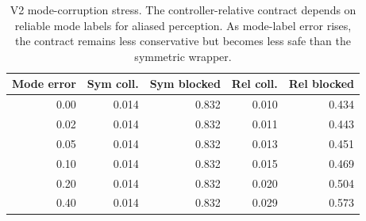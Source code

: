 \begin{table}[t]
\centering
\caption{V2 mode-corruption stress. The controller-relative contract depends on reliable mode labels for aliased perception. As mode-label error rises, the contract remains less conservative but becomes less safe than the symmetric wrapper.}
\label{tab:mode-corruption}
\begin{tabular}{rrrrr}
\toprule
Mode error & Sym coll. & Sym blocked & Rel coll. & Rel blocked \\
\midrule
0.00 & 0.014 & 0.832 & 0.010 & 0.434 \\
0.02 & 0.014 & 0.832 & 0.011 & 0.443 \\
0.05 & 0.014 & 0.832 & 0.013 & 0.451 \\
0.10 & 0.014 & 0.832 & 0.015 & 0.469 \\
0.20 & 0.014 & 0.832 & 0.020 & 0.504 \\
0.40 & 0.014 & 0.832 & 0.029 & 0.573 \\
\bottomrule
\end{tabular}
\end{table}
